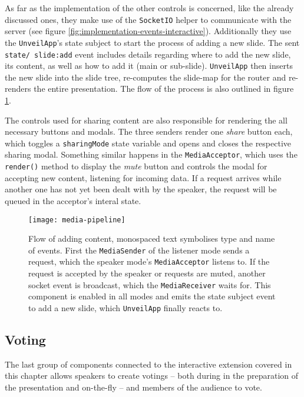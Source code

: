As far as the implementation of the other controls is concerned, like the already discussed ones, they make use of the \texttt{SocketIO} helper to communicate with the server (see figure \ref{fig:implementation-events-interactive}). Additionally they use the \texttt{UnveilApp}'s state subject to start the process of adding a new slide. The sent \texttt{state/ slide:add} event includes details regarding where to add the new slide, its content, as well as how to add it (main or sub-slide). \texttt{UnveilApp} then inserts the new slide into the slide tree, re-computes the slide-map for the router and re-renders the entire presentation. The flow of the process is also outlined in figure \ref{fig:implementation-interactive-media-pipeline}.

The controls used for sharing content are also responsible for rendering the all necessary buttons and modals. The three senders render one \emph{share} button each, which toggles a \texttt{sharingMode} state variable and opens and closes the respective sharing modal. Something similar happens in the \texttt{MediaAcceptor}, which uses the \texttt{render()} method to display the \emph{mute} button and controls the modal for accepting new content, listening for incoming data. If a request arrives while another one has not yet been dealt with by the speaker, the request will be queued in the acceptor's interal state.

\begin{figure}
\centering
\texttt{[image: media-pipeline]}
\caption{Flow of adding content, monospaced text symbolises type and name of events. First the \texttt{MediaSender} of the listener mode sends a request, which the speaker mode's \texttt{MediaAcceptor} listens to. If the request is accepted by the speaker or requests are muted, another socket event is broadcast, which the \texttt{MediaReceiver} waits for. This component is enabled in all modes and emits the state subject event to add a new slide, which \texttt{UnveilApp} finally reacts to.}
\label{fig:implementation-interactive-media-pipeline}
\end{figure}

\subsection{Voting}
\label{sec:implementation-interactive-voting}

The last group of components connected to the interactive extension covered in this chapter allows speakers to create votings -- both during in the preparation of the presentation and on-the-fly -- and members of the audience to vote.

